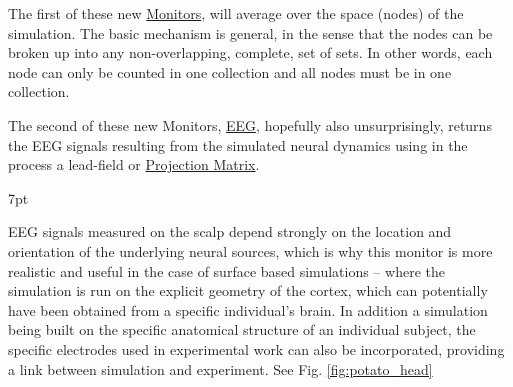 \documentclass{tufte-handout}
\newenvironment{blah}{%
  \def\FrameCommand{%
    \hspace{1pt}%
    {\color{DarkOrange}\vrule width 2pt}%
    {\color{PeachPuff}\vrule width 4pt}%
    \colorbox{PeachPuff}%
  }%
  \MakeFramed{\advance\hsize-\width\FrameRestore}%
  \noindent\hspace{-4.55pt}%
  \begin{adjustwidth}{}{7pt}%
  \vspace{2pt}\vspace{2pt}%
}
{%
  \vspace{2pt}\end{adjustwidth}\endMakeFramed%
}
\begin{document}
The first of these new \underline{Monitors},  will average over the
space (nodes) of the simulation.  The basic
mechanism is general, in the sense that the nodes can be broken up into any
non-overlapping, complete, set of sets. In other words, each node can only
be counted in one collection and all nodes must be in one collection.  





The second of these new Monitors, \underline{EEG}, hopefully also
unsurprisingly, returns the EEG signals resulting from the simulated neural
dynamics using in the process a lead-field or \underline{Projection Matrix}.  



\begin{blah}
EEG signals measured on the scalp depend strongly on the location
and orientation of the underlying neural sources, which is why this monitor is
more realistic and useful in the case of surface based simulations -- where
the simulation is run on the explicit geometry of the cortex, which can
potentially have been obtained from a specific individual's brain. 
In addition a simulation being built on the specific anatomical structure of an individual
subject, the specific electrodes used in experimental work can also be
incorporated, providing a link between simulation and
experiment. See Fig. \ref{fig:potato_head}
\end{blah}
\end{document}
